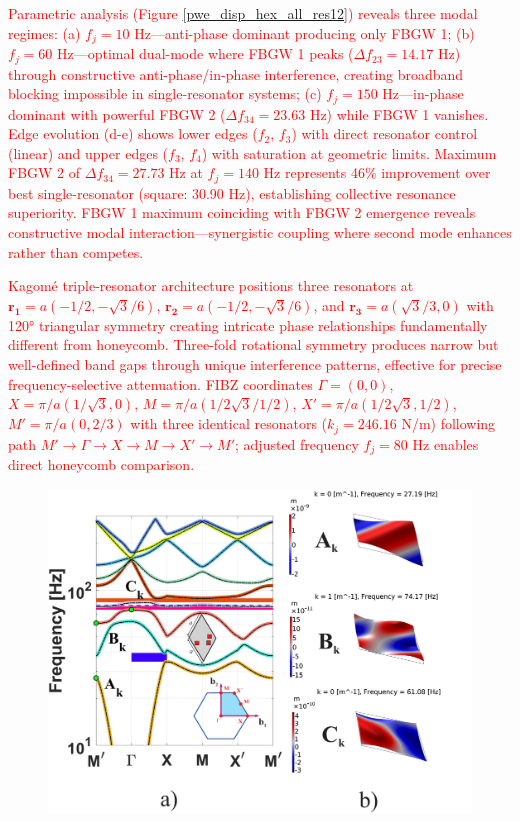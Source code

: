 \documentclass[review,numbers,sort&compress]{elsarticle}
\begin{document}
{\textcolor{red}{Parametric analysis (Figure \ref{pwe_disp_hex_all_res12}) reveals three modal regimes: (a) $f_j = 10$ Hz—anti-phase dominant producing only FBGW 1; (b) $f_j = 60$ Hz—optimal dual-mode where FBGW 1 peaks ($\Delta f_{23} = 14.17$ Hz) through constructive anti-phase/in-phase interference, creating broadband blocking impossible in single-resonator systems; (c) $f_j = 150$ Hz—in-phase dominant with powerful FBGW 2 ($\Delta f_{34} = 23.63$ Hz) while FBGW 1 vanishes. Edge evolution (d-e) shows lower edges ($f_2$, $f_3$) with direct resonator control (linear) and upper edges ($f_3$, $f_4$) with saturation at geometric limits. Maximum FBGW 2 of $\Delta f_{34} = 27.73$ Hz at $f_j = 140$ Hz represents 46\% improvement over best single-resonator (square: 30.90 Hz), establishing collective resonance superiority. FBGW 1 maximum coinciding with FBGW 2 emergence reveals constructive modal interaction—synergistic coupling where second mode enhances rather than competes.}


\textcolor{red}{Kagomé triple-resonator architecture positions three resonators at \( \mathbf{r_1} = a(-1/2, -\sqrt{3}/6) \), \( \mathbf{r_2} = a(-1/2, -\sqrt{3}/6) \), and \( \mathbf{r_3} = a(\sqrt{3}/3, 0) \) with 120° triangular symmetry creating intricate phase relationships fundamentally different from honeycomb. Three-fold rotational symmetry produces narrow but well-defined band gaps through unique interference patterns, effective for precise frequency-selective attenuation. FIBZ coordinates \( \Gamma = (0,0) \), \( X = \pi/a(1/\sqrt{3},0) \), \( M = \pi/a(1/2\sqrt{3}/1/2) \), \( X' = \pi/a(1/2\sqrt{3},1/2) \), \( M' = \pi/a(0,2/3) \) with three identical resonators (\( k_j = 246.16 \) N/m) following path \( M' \longrightarrow \Gamma \longrightarrow X \longrightarrow M \longrightarrow X' \longrightarrow M' \); adjusted frequency \( f_j = 80 \) Hz enables direct honeycomb comparison.}

\newpage
\begin{figure}[t]
\centering
\includegraphics[width=.7\textwidth]{1_5_disp_frf_kag.pdf}


\end{figure}}
\end{document}
